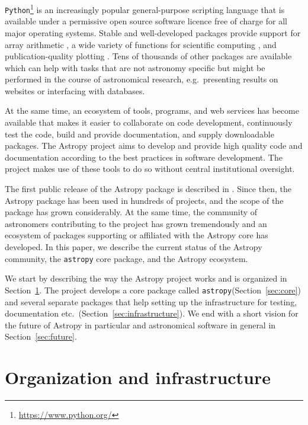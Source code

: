 \documentclass[modern]{aastex61}
\newcommand{\package}[1]{\texttt{#1}\xspace}
\newcommand{\python}{\package{Python}}
\newcommand{\astropy}{Astropy\xspace}
\newcommand{\astropypkg}{\package{astropy}}
\newcommand{\sectionname}{Section\xspace}
\begin{document}
\python\footnote{\url{https://www.python.org/}} is an increasingly popular
general-purpose scripting language that is available under a permissive open
source software licence free of charge for all major operating systems. Stable
and well-developed packages provide support for array arithmetic
\citep[\package{numpy},][]{numpy}, a wide variety of functions for scientific
computing \citep[\package{scipy},][]{numpy}, and publication-quality plotting
\citep[\package{matplotlib},][]{matplotlib}. Tens of thousands of other packages
are available which can help with tasks that are not astronomy specific but
might be performed in the course of astronomical research, e.g.\ presenting
results on websites or interfacing with databases.

At the same time, an ecosystem of tools, programs, and web services
has become available that makes it easier to collaborate on code development,
continuously test the code, build and provide documentation, and
supply downloadable packages. The \astropy project aims to develop and
provide high quality code and documentation according to the best
practices in software development. The project makes use of these
tools to do so without central institutional oversight.

The first public release of the \astropy package is described in
\cite{astropy}. Since then, the \astropy package has been
used in hundreds of projects, and the scope of the package has grown
considerably. At the same time, the community of astronomers
contributing to the project has grown tremendously and an ecosystem
of packages supporting or affiliated with the \astropy core has
developed. In this paper, we describe the current status of the
\astropy community, the \astropypkg core package, and the \astropy
ecosystem.

We start by describing the way the \astropy project works and is
organized in \sectionname~\ref{sec:org}.  The project develops a core
package called \astropypkg (\sectionname~\ref{sec:core}) and several
separate packages that help setting up the infrastructure for testing,
documentation etc.\ (\sectionname~\ref{sec:infrastructure}).
We end with a short vision for
the future of \astropy in particular and astronomical software in general
in \sectionname~\ref{sec:future}.


\section{Organization and infrastructure}
\label{sec:org}
\end{document}
